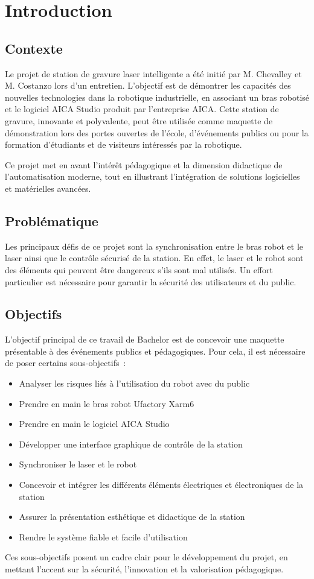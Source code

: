 \chapter{Introduction}

\section{Contexte}

Le projet de station de gravure laser intelligente a été initié par M. Chevalley et M. Costanzo lors d'un entretien. L'objectif est de démontrer les capacités des nouvelles technologies dans la robotique industrielle, en associant un bras robotisé et le logiciel AICA Studio produit par l'entreprise AICA. Cette station de gravure, innovante et polyvalente, peut être utilisée comme maquette de démonstration lors des portes ouvertes de l'école, d'événements publics ou pour la formation d'étudiants et de visiteurs intéressés par la robotique.

Ce projet met en avant l'intérêt pédagogique et la dimension didactique de l'automatisation moderne, tout en illustrant l'intégration de solutions logicielles et matérielles avancées.

\section{Problématique}

Les principaux défis de ce projet sont la synchronisation entre le bras robot et le laser ainsi que le contrôle sécurisé de la station. En effet, le laser et le robot sont des éléments qui peuvent être dangereux s'ils sont mal utilisés. Un effort particulier est nécessaire pour garantir la sécurité des utilisateurs et du public.

\section{Objectifs}

L'objectif principal de ce travail de Bachelor est de concevoir une maquette présentable à des événements publics et pédagogiques. Pour cela, il est nécessaire de poser certains sous-objectifs :

\begin{itemize}
    \item Analyser les risques liés à l'utilisation du robot avec du public
    \item Prendre en main le bras robot Ufactory Xarm6
    \item Prendre en main le logiciel AICA Studio
    \item Développer une interface graphique de contrôle de la station
    \item Synchroniser le laser et le robot
    \item Concevoir et intégrer les différents éléments électriques et électroniques de la station
    \item Assurer la présentation esthétique et didactique de la station
    \item Rendre le système fiable et facile d'utilisation
\end{itemize}

Ces sous-objectifs posent un cadre clair pour le développement du projet, en mettant l'accent sur la sécurité, l'innovation et la valorisation pédagogique.


